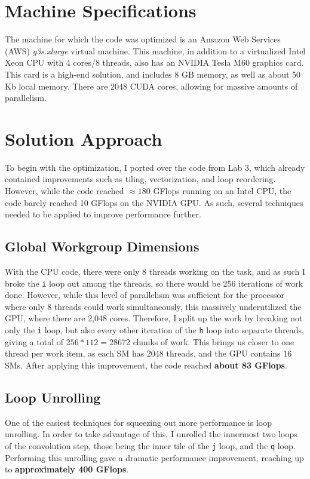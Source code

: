 \documentclass[letterpaper,twocolumn,10pt]{article}
\def\code#1{\texttt{#1}}
\begin{document}
\section{Machine Specifications}

The machine for which the code was optimized is an Amazon Web  Services (AWS)
\textit{g3s.xlarge} virtual machine. This machine, in addition to a virtualized
Intel Xeon CPU with 4 cores/8 threads, also has an NVIDIA Tesla M60 graphics
card. This card is a high-end solution, and includes 8 GB memory, as well as
about 50 Kb local memory. There are 2048 CUDA cores, allowing for massive
amounts of parallelism.

\section{Solution Approach}
To begin with the optimization, I ported over the code from Lab 3, which
already contained improvements such as tiling, vectorization, and loop
reordering. However, while the code reached $\approx180$ GFlops running on an
Intel CPU, the code barely reached 10 GFlops on the NVIDIA GPU. As such,
several techniques needed to be applied to improve performance further.

\subsection{Global Workgroup Dimensions}
With the CPU code, there were only 8 threads working on the task, and as such
I broke the \code{i} loop out among the threads, so there would be 256
iterations of work done. However, while this level of parallelism was
sufficient for the processor where only 8 threads could work simultaneously,
this massively underutilized the GPU, where there are 2,048 cores. Therefore,
I split up the work by breaking not only the \code{i} loop, but also every
other iteration of the \code{h} loop into separate threads, giving a total of
$256*112 = 28672$ chunks of work. This brings us closer to one thread per work
item, as each SM has 2048 threads, and the GPU contains 16 SMs. After applying
this improvement, the code reached \textbf{about 83 GFlops}.

\subsection{Loop Unrolling}
One of the easiest techniques for squeezing out more performance is loop
unrolling. In order to take advantage of this, I unrolled the innermost two
loops of the convolution step, those being the inner tile of the \code{j} loop,
and the \code{q} loop. Performing this unrolling gave a dramatic performance
improvement, reaching up to \textbf{approximately 400 GFlops}.
\end{document}
